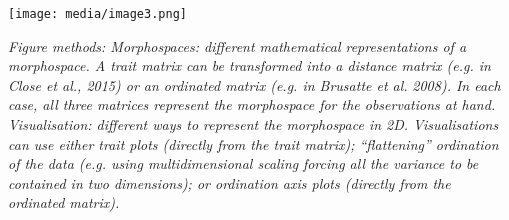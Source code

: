










\texttt{[image: media/image3.png]}

\emph{Figure methods: Morphospaces: different mathematical
representations of a} \emph{morphospace. A trait matrix can be
transformed into a distance matrix (e.g. in Close et al., 2015) or an
ordinated matrix (e.g. in Brusatte et al.} \emph{2008). In each case,
all three matrices represent the morphospace for the observations at
hand. Visualisation: different ways to represent the morphospace in 2D.
Visualisations can use either trait plots (directly from the trait
matrix); ``flattening'' ordination of the data (e.g. using
multidimensional scaling} \emph{forcing all the variance to be contained
in two dimensions); or ordination axis plots (directly from the
ordinated matrix).}

